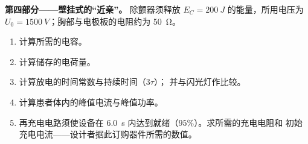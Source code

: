 \begin{problem}
\medskip
\noindent\textbf{第四部分——壁挂式的“近亲”。}
除颤器须释放 $E_C = \qty{200}{J}$ 的能量，所用电压为
$U_0 = \qty{1500}{V}$；胸部与电极板的电阻约为 \qty{50}{\ohm}。
\begin{enumerate}[resume]
  \item 计算所需的电容。
  \item 计算储存的电荷量。
  \item 计算放电的时间常数与持续时间（$3\tau$）；
        并与闪光灯作比较。
  \item 计算患者体内的峰值电流与峰值功率。
  \item 再充电电路须使设备在
        \qty{6.0}{s} 内达到就绪（$95\%$）。求所需的充电电阻和
        初始充电电流——设计者据此订购器件所需的数值。
\end{enumerate}
\end{problem}
